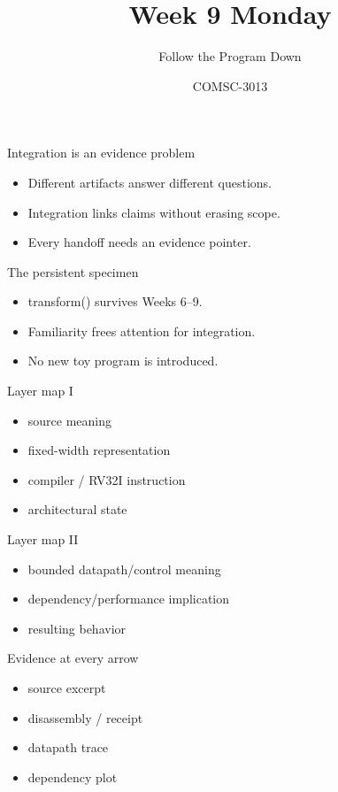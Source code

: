 \documentclass{beamer}
\title{Week 9 Monday}\subtitle{Follow the Program Down}\author{COMSC-3013}\date{}
\begin{document}
\begin{frame}\titlepage\end{frame}
\begin{frame}{Integration is an evidence problem}\begin{itemize}\item Different artifacts answer different questions.\item Integration links claims without erasing scope.\item Every handoff needs an evidence pointer.\end{itemize}\end{frame}
\begin{frame}{The persistent specimen}\begin{itemize}\item transform() survives Weeks 6--9.\item Familiarity frees attention for integration.\item No new toy program is introduced.\end{itemize}\end{frame}
\begin{frame}{Layer map I}\begin{itemize}\item source meaning\item fixed-width representation\item compiler / RV32I instruction\item architectural state\end{itemize}\end{frame}
\begin{frame}{Layer map II}\begin{itemize}\item bounded datapath/control meaning\item dependency/performance implication\item resulting behavior\end{itemize}\end{frame}
\begin{frame}{Evidence at every arrow}\begin{itemize}\item source excerpt\item disassembly / receipt\item datapath trace\item dependency plot\end{itemize}\end{frame}
\end{document}
